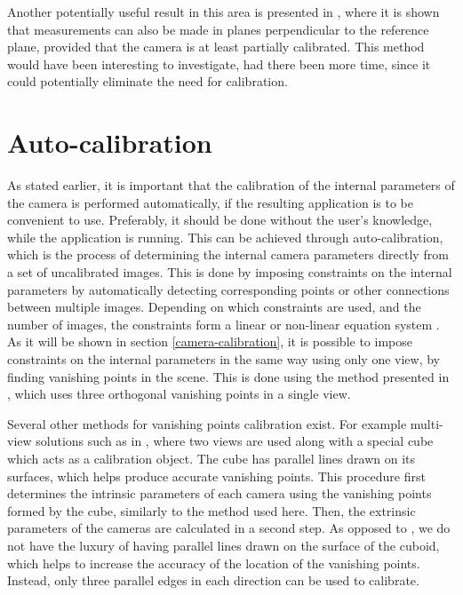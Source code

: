 Another potentially useful result in this area is presented in \cite{huang2004new}, where it is shown that measurements can also be made in planes perpendicular to the reference plane, provided that the camera is at least partially calibrated.
This method would have been interesting to investigate, had there been more time, since it could potentially eliminate the need for calibration.

\section{Auto-calibration} \label{related_work:vanishing_point_calibration} 
As stated earlier, it is important that the calibration of the internal parameters of the camera is performed automatically, if the resulting application is to be convenient to use.
Preferably, it should be done without the user's knowledge, while the application is running.
This can be achieved through auto-calibration, which is the process of determining the internal camera parameters directly from a set of uncalibrated images.
This is done by imposing constraints on the internal parameters by automatically detecting corresponding points or other connections between multiple images. 
Depending on which constraints are used, and the number of images, the constraints form a linear or non-linear equation system \cite[p. 458-469]{hartley-zisserman}. 
As it will be shown in section \ref{camera-calibration}, it is possible to impose constraints on the internal parameters in the same way using only one view, by finding vanishing points in the scene.
This is done using the method presented in \cite[p. 195-226]{hartley-zisserman}, which uses three orthogonal vanishing points in a single view.

Several other methods for vanishing points calibration exist.
For example multi-view solutions such as in \cite{caprile1990using}, where two views are used along with a special cube which acts as a calibration object.
The cube has parallel lines drawn on its surfaces, which helps produce accurate vanishing points.
This procedure first determines the intrinsic parameters of each camera using the vanishing points formed by the cube, similarly to the method used here.
Then, the extrinsic parameters of the cameras are calculated in a second step.
As opposed to \cite{caprile1990using}, we do not have the luxury of having parallel lines drawn on the surface of the cuboid, which helps to increase the accuracy of the location of the vanishing points.
Instead, only three parallel edges in each direction can be used to calibrate.

